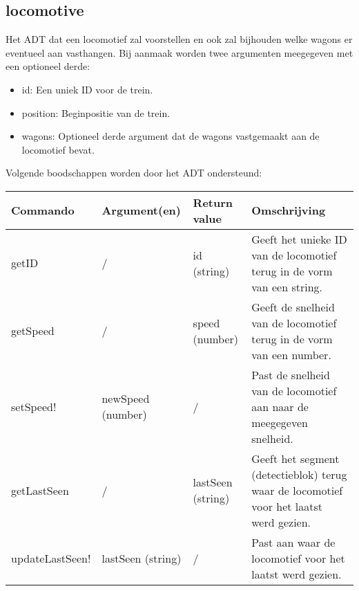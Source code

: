 \documentclass{article}
\begin{document}
\subsection{locomotive} %
Het ADT dat een locomotief zal voorstellen en ook zal bijhouden welke wagons er eventueel aan vasthangen. Bij aanmaak worden twee argumenten meegegeven met een optioneel derde:
\begin{itemize}
  \item id: Een uniek ID voor de trein.
  \item position: Beginpositie van de trein.
  \item wagons: Optioneel derde argument dat de wagons vastgemaakt aan de locomotief bevat.
\end{itemize}
Volgende boodschappen worden door het ADT ondersteund:
\begin{center}
    \begin{tabular}{ | l | l | l | p{6.5cm} |}
    \hline
    Commando & Argument(en) & Return value & Omschrijving \\ \hline
    getID & / & id (string) & Geeft het unieke ID van de locomotief terug in de vorm van een string. \\ \hline
    getSpeed & / & speed (number) & Geeft de snelheid van de locomotief terug in de vorm van een number. \\ \hline
    setSpeed! & newSpeed (number) & / & Past de snelheid van de locomotief aan naar de meegegeven snelheid. \\ \hline
    getLastSeen & / & lastSeen (string) & Geeft het segment (detectieblok) terug waar de locomotief voor het laatst werd gezien. \\ \hline
    updateLastSeen! & lastSeen (string) & / & Past aan waar de locomotief voor het laatst werd gezien. \\ \hline
    \end{tabular}
\end{center}
\end{document}
